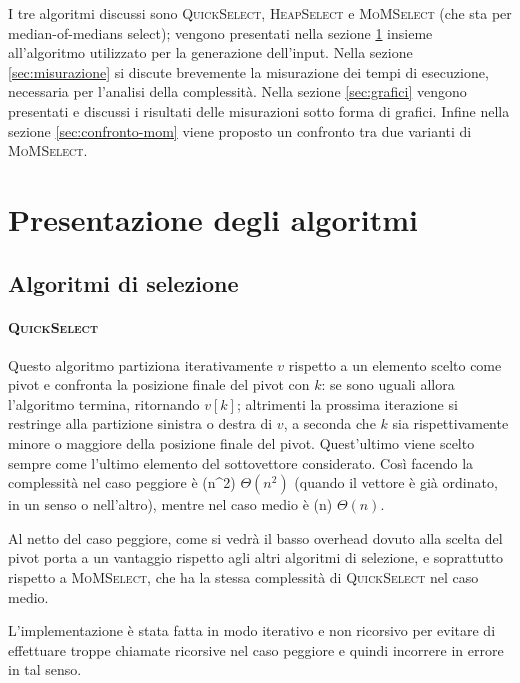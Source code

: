 \documentclass[a4paper,12pt]{article}
\newcommand{\QuickSelect}{\textsc{QuickSelect}}
\newcommand{\HeapSelect}{\textsc{HeapSelect}}
\newcommand{\MoMSelect}{\textsc{MoMSelect}}
\newcommand{\Tquad}{\ifmmode \Theta(n^2) \else $\Theta(n^2)$\fi} %
\newcommand{\Tlin}{\ifmmode \Theta(n) \else $\Theta(n)$\fi} %
\begin{document}
I tre algoritmi discussi sono \QuickSelect{}, \HeapSelect{} e \MoMSelect{} (che sta per median-of-medians select); vengono presentati nella sezione \ref{sec:presentazione-algoritmi} insieme all'algoritmo utilizzato per la generazione dell'input.
Nella sezione \ref{sec:misurazione} si discute brevemente la misurazione dei tempi di esecuzione, necessaria per l'analisi della complessità.
Nella sezione \ref{sec:grafici} vengono presentati e discussi i risultati delle misurazioni sotto forma di grafici.
Infine nella sezione \ref{sec:confronto-mom} viene proposto un confronto tra due varianti di \MoMSelect{}.



\section{Presentazione degli algoritmi}
\label{sec:presentazione-algoritmi}

\subsection{Algoritmi di selezione}
\paragraph{\QuickSelect}
Questo algoritmo partiziona iterativamente $v$ rispetto a un elemento scelto come pivot e confronta la posizione finale del pivot con $k$: se sono uguali allora l'algoritmo termina, ritornando $v[k]$; altrimenti la prossima iterazione si restringe alla partizione sinistra o destra di $v$, a seconda che $k$ sia rispettivamente minore o maggiore della posizione finale del pivot.
Quest'ultimo viene scelto sempre come l'ultimo elemento del sottovettore considerato.
Così facendo la complessità nel caso peggiore è \Tquad{} (quando il vettore è già ordinato, in un senso o nell'altro), mentre nel caso medio è \Tlin.

Al netto del caso peggiore, come si vedrà il basso overhead dovuto alla scelta del pivot porta a un vantaggio rispetto agli altri algoritmi di selezione, e soprattutto rispetto a \MoMSelect{}, che ha la stessa complessità di \QuickSelect{} nel caso medio.

L'implementazione è stata fatta in modo iterativo e non ricorsivo per evitare di effettuare troppe chiamate ricorsive nel caso peggiore e quindi incorrere in errore in tal senso.
\end{document}
